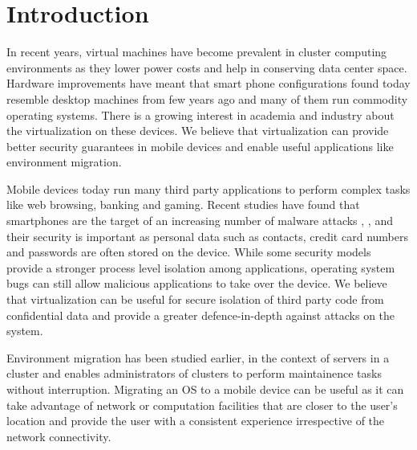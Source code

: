 \section{Introduction}
In recent years, virtual machines have become prevalent in cluster computing environments \cite{gartner2009virtual} as they lower power costs and help in conserving data center space. Hardware improvements have meant that smart phone configurations found today resemble desktop machines from few years ago and many of them run commodity operating systems. There is a growing interest in academia \cite{cox2007pocket} and industry \cite{vmware2009nextfrontier} about the virtualization on these devices. We believe that virtualization can provide better security guarantees in mobile devices and enable useful applications like environment migration.

Mobile devices today run many third party applications to perform complex tasks like web browsing, banking and gaming. Recent studies have found that smartphones are the target of an increasing number of malware attacks \cite{bose2006mobile},  \cite{cybercriminals2007banks},  \cite{iphone2010seriot} and their security is important as personal data such as contacts, credit card numbers and passwords are often stored on the device. While some security models \cite{androidsecurity} provide a stronger process level isolation among applications, operating system bugs \cite{kernel2009vulnerability} can still allow malicious applications to take over the device. We believe that virtualization can be useful for secure isolation of third party code from confidential data and provide a greater defence-in-depth against attacks on the system.

Environment migration has been studied earlier, in the context of servers in a cluster \cite{clark2005live} and enables administrators of clusters to perform maintainence tasks without interruption. Migrating an OS to a mobile device can be useful as it can take advantage of network or computation facilities that are closer to the user's location and provide the user with a consistent experience irrespective of the network connectivity. 
